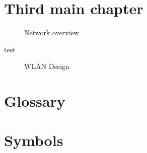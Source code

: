 \documentclass{book}
\begin{document}
\chapter{Third main chapter}
\begin{figure}
  \centering
  \caption{Network overview}
\end{figure}





\begin{table}
  \centering{}
  \caption{test}
\end{table}
  

\begin{figure}
  \centering{}
  \caption{WLAN Design}
\end{figure}


\appendix{}
\cleardoublepage{}



\chapter{Glossary}

\chapter{Symbols}
\end{document}
